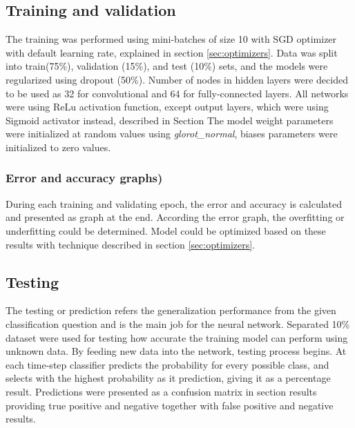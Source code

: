 \subsection{Training and validation}
The training was performed using mini-batches of size 10 with SGD optimizer with default learning rate, explained in section \ref{sec:optimizers}. Data was split into train(75\%), validation (15\%), and test (10\%) sets, and the models were regularized using dropout (50\%). Number of nodes in hidden layers were decided to be used as 32 for convolutional and 64 for fully-connected layers. All networks were using ReLu activation function, except output layers, which were using Sigmoid activator instead, described in Section %
The model weight parameters were initialized at random values using \textit{glorot\_normal}, biases parameters were initialized to zero values.


\subsubsection{Error and accuracy graphs)}
During each training and validating epoch, the error and accuracy is calculated and presented as graph at the end. According the error graph, the overfitting or underfitting could be determined. Model could be optimized based on these results with technique described in section \ref{sec:optimizers}.

\subsection{Testing}
The testing or prediction refers the generalization performance from the given classification question and is the main job for the neural network.
Separated 10\% dataset were used for testing how accurate the training model can perform using unknown data. By feeding new data into the network, testing process begins. At each time-step classifier predicts the probability for every possible class, and selects with the highest probability as it prediction, giving it as a percentage result. Predictions were presented as a confusion matrix in section {results} providing true positive and negative together with false positive and negative results.
